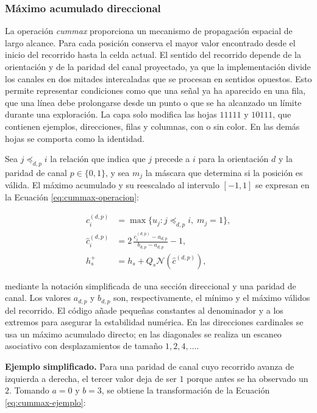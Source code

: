 \documentclass[11pt,a4paper,spanish]{book}
\numberwithin{equation}{chapter}
\numberwithin{figure}{chapter}
\begin{document}
\subsubsection{Máximo acumulado direccional}

La operación \textit{cummax} proporciona un mecanismo de propagación espacial de largo alcance. Para cada posición conserva el mayor
valor encontrado desde el inicio del recorrido hasta la celda actual. El sentido del recorrido depende de la orientación y de la paridad
del canal proyectado, ya que la implementación divide los canales en dos mitades intercaladas que se procesan en sentidos opuestos. Esto
permite representar condiciones como que una señal ya ha
aparecido en una fila, que una línea debe prolongarse desde un punto o que se ha alcanzado un límite durante una exploración. La capa
solo modifica las hojas \(11111\) y \(10111\), que contienen ejemplos, direcciones, filas y columnas, con o sin color. En las
demás hojas se comporta como la identidad.

Sea \(j\preceq_{d,p} i\) la relación que indica que \(j\) precede a \(i\) para la orientación \(d\) y la paridad de canal
\(p\in\{0,1\}\), y sea \(m_j\) la máscara que determina si la posición es válida. El máximo acumulado y su reescalado al intervalo
\([-1,1]\) se expresan en la Ecuación \eqref{eq:cummax-operacion}:

\begin{equation}\label{eq:cummax-operacion}
\begin{aligned}
c_i^{(d,p)}&=\max\{u_j: j\preceq_{d,p} i,\;m_j=1\},\\
\widehat{c}_i^{(d,p)}&=2\,\frac{c_i^{(d,p)}-a_{d,p}}{b_{d,p}-a_{d,p}}-1,\\
h_s^{+}&=h_s+Q_s\mathcal{N}\!\left(\widehat{c}^{(d,p)}\right),
\end{aligned}
\end{equation}

mediante la notación simplificada de una sección direccional y una paridad de canal. Los valores \(a_{d,p}\) y \(b_{d,p}\) son,
respectivamente, el mínimo y el máximo válidos del recorrido. El código añade pequeñas constantes al
denominador y a los extremos para asegurar la estabilidad numérica. En las direcciones cardinales se usa un máximo acumulado directo;
en las diagonales se realiza un escaneo asociativo con desplazamientos de tamaño \(1,2,4,\ldots\).

\textbf{Ejemplo simplificado.} Para una paridad de canal cuyo recorrido avanza de izquierda a derecha, el tercer valor deja de ser
\(1\) porque antes se ha observado un \(2\). Tomando \(a=0\) y \(b=3\), se obtiene la transformación de la Ecuación
\eqref{eq:cummax-ejemplo}:
\end{document}

